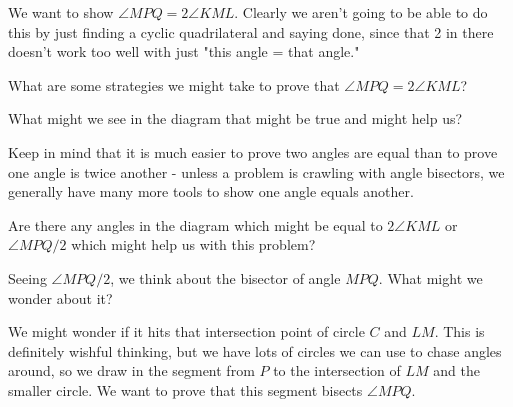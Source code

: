 We want to show $\angle MPQ = 2 \angle KML.$ Clearly we aren't going to be able to do this by just finding a cyclic quadrilateral and saying done, since that 2 in there doesn't work too well with just "this angle = that angle."

What are some strategies we might take to prove that $\angle MPQ =2 \angle KML$?

What might we see in the diagram that might be true and might help us?


Keep in mind that it is much easier to prove two angles are equal than to prove one angle is twice another - unless a problem is crawling with angle bisectors, we generally have many more tools to show one angle equals another.

Are there any angles in the diagram which might be equal to $2 \angle KML$ or $\angle MPQ/2$ which might help us with this problem?

Seeing $\angle MPQ/2$, we think about the bisector of angle $MPQ.$ What might we wonder about it?








We might wonder if it hits that intersection point of circle $C$ and $LM.$ This is definitely wishful thinking, but we have lots of circles we can use to chase angles around, so we draw in the segment from $P$ to the intersection of $LM$ and the smaller circle. We want to prove that this segment bisects $\angle MPQ.$

